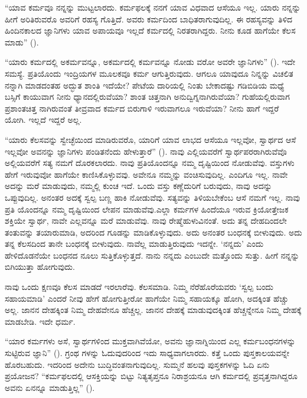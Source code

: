“ಯಾವ ಕರ್ಮವೂ ನನ್ನನ್ನು ಮುಟ್ಟಲಾರದು. ಕರ್ಮಫಲಕ್ಕೆ ನನಗೆ ಯಾವ ವಿಧವಾದ ಆಸೆಯೂ ಇಲ್ಲ. ಯಾರು ನನ್ನನ್ನು ಹೀಗೆ ಅರಿತಿರುವರೊ ಅವರಿಗೆ ರಹಸ್ಯ ಗೊತ್ತಿದೆ. ಅವರು ಕರ್ಮದಿಂದ ಬಾಧಿತರಾಗುವುದಿಲ್ಲ. ಈ ರಹಸ್ಯವನ್ನು ತಿಳಿದ ಹಿಂದಿನಕಾಲದ ಜ್ಞಾನಿಗಳು ಯಾವ ಅಪಾಯವೂ ಇಲ್ಲದೆ ಕರ್ಮದಲ್ಲಿ ನಿರತರಾಗಿದ್ದರು. ನೀನು ಕೂಡ ಹಾಗೆಯೇ ಕೆಲಸ ಮಾಡು” ().

“ಯಾರು ಕರ್ಮದಲ್ಲಿ ಅಕರ್ಮವನ್ನೂ, ಅಕರ್ಮದಲ್ಲಿ ಕರ್ಮವನ್ನೂ ನೋಡು ವರೋ ಅವರೇ ಜ್ಞಾನಿಗಳು” (). ಇದೇ ಸಮಸ್ಯೆ. ಪ್ರತಿಯೊಂದು ಇಂದ್ರಿಯಗಳ ಮೂಲಕವೂ ಕರ್ಮ ಆಗುತ್ತಿರುವುದು. ಆಗಲೂ ಯಾವುದೂ ನಿನ್ನನ್ನು ವಿಚಲಿತ ನನ್ನಾಗಿ ಮಾಡದಂತಹ ಅದ್ಭುತ ಶಾಂತಿ ಇದೆಯೇ? ಪೇಟೆಯ ದಾರಿಯಲ್ಲಿ ನಿಂತು ಬೇಕಾದಷ್ಟು ಗಡಿಬಿಡಿಯ ಮಧ್ಯೆ ಬಸ್ಸಿಗೆ ಕಾಯುವಾಗ ನೀನು ಧ್ಯಾನದಲ್ಲಿರುವೆಯಾ? ಶಾಂತ ಚಿತ್ತನಾಗಿ ಅನುದ್ವಿಗ್ನನಾಗಿರುವೆಯಾ? ಗುಹೆಯಲ್ಲಿರುವಾಗ ಪ್ರಶಾಂತಚಿತ್ತ ನಾಗಿರುವಂತೆ ತೀವ್ರವಾದ ಕರ್ಮದ ಬಿರುಗಾಳಿ ಇರುವಾಗಲೂ ಇರುವೆಯಾ? ನೀನು ಹಾಗೆ ಇದ್ದರೆ ಯೋಗಿ. ಇಲ್ಲದೆ ಇದ್ದರೆ ಅಲ್ಲ.

“ಯಾರು ಕೆಲಸವನ್ನು ಸ್ವೇಚ್ಛೆಯಿಂದ ಮಾಡಿರುವರೊ, ಯಾರಿಗೆ ಯಾವ ಲಾಭದ ಆಸೆಯೂ ಇಲ್ಲವೋ, ಸ್ವಾರ್ಥದ ಆಸೆ ಇಲ್ಲವೋ ಅವನನ್ನು ಜ್ಞಾನಿಗಳು ಪಂಡಿತನೆಂದು ಹೇಳುತ್ತಾರೆ” (). ನಾವು ಎಲ್ಲಿಯವರೆಗೆ ಸ್ವಾರ್ಥಪರರಾಗಿರುವೆವೊ ಅಲ್ಲಿಯವರೆಗೆ ಸತ್ಯ ನಮಗೆ ದೊರಕಲಾರದು. ನಾವು ಪ್ರತಿಯೊಂದನ್ನೂ ನಮ್ಮ ದೃಷ್ಟಿಯಿಂದ ನೋಡುವೆವು. ವಸ್ತುಗಳು ಹೇಗೆ ಇರುವುವೋ ಹಾಗೆಯೇ ಕಾಣಿಸಿಕೊಳ್ಳುವವು. ಅವೇನೂ ನಮ್ಮನ್ನು ವಂಚಿಸುವುದಿಲ್ಲ. ಎಂದಿಗೂ ಇಲ್ಲ. ನಾವೇ ಅದನ್ನು ಮರೆ ಮಾಡುವುದು, ನಮ್ಮಲ್ಲಿ ಕುಂಚ ಇದೆ. ಒಂದು ವಸ್ತು ಕಣ್ಣೆದುರಿಗೆ ಬರುವುದು, ನಾವು ಅದನ್ನು ಒಪ್ಪುವುದಿಲ್ಲ. ಅನಂತರ ಅದಕ್ಕೆ ಸ್ವಲ್ಪ ಬಣ್ಣ ಹಾಕಿ ನೋಡುವೆವು. ಸತ್ಯವನ್ನು ತಿಳಿಯಬೇಕೆಂಬ ಆಸೆ ನಮಗೆ ಇಲ್ಲ. ನಾವು ಪ್ರತಿ ಯೊಂದನ್ನೂ ನಮ್ಮ ದೃಷ್ಟಿಯಿಂದ ಲೇಪನ ಮಾಡುವೆವು.ಎಲ್ಲಾ ಕರ್ಮಗಳ ಹಿಂದೆಯೂ ಇರುವ ಕ್ರಿಯೋತ್ತೇಜಕ ಶಕ್ತಿಯೇ ಸ್ವಾರ್ಥ, ನಾವೇ ಎಲ್ಲವನ್ನೂ ಮರೆ ಮಾಡುವೆವು. ನಾವು ರೇಷ್ಮೆಹುಳುವಿನಂತೆ. ಅದು ತನ್ನ ದೇಹದಿಂದಲೇ ತಂತುವನ್ನು ತಯಾರುಮಾಡಿ, ಅದರಿಂದ ಗೂಡನ್ನು ಮಾಡಿಕೊಳ್ಳುವುದು. ಅದು ಅನಂತರ ಬಂಧನಕ್ಕೆ ಬೀಳುವುದು. ಅದು ತನ್ನ ಕೆಲಸದಿಂದ ತಾನೇ ಬಂಧನಕ್ಕೆ ಬೀಳುವುದು. ನಾವೆಲ್ಲ ಮಾಡುತ್ತಿರುವುದು ಇದನ್ನೇ. ‘ನನ್ನದು’ ಎಂದು ಹೇಳಿದೊಡನೆಯೇ ಬಂಧನದ ನೂಲು ಸುತ್ತಿಕೊಳ್ಳುತ್ತದೆ. ನಾನು ನನ್ನದು ಎಂಬುದೇ ಮತ್ತೊಂದು ಸುತ್ತು. ಹೀಗೆ ನನ್ನನ್ನು ಬಿಗಿಯುತ್ತಾ ಹೋಗುವುದು.

ನಾವು ಒಂದು ಕ್ಷಣವೂ ಕೆಲಸ ಮಾಡದೆ ಇರಲಾರೆವು. ಕೆಲಸಮಾಡಿ. ನಿಮ್ಮ ನೆರೆಹೊರೆಯವರು ‘ಸ್ವಲ್ಪ ಬಂದು ಸಹಾಯಮಾಡಿ’ ಎಂದರೆ ನೀವು ಹೇಗೆ ಹೋಗುತ್ತೀರೋ ಹಾಗೆಯೇ ನಿಮ್ಮ ಸಹಾಯಕ್ಕೂ ಹೋಗಿ, ಅದಕ್ಕಿಂತ ಹೆಚ್ಚು ಅಲ್ಲ. ಜಾನನ ದೇಹಕ್ಕಿಂತ ನಿಮ್ಮ ದೇಹವೇನೂ ಹೆಚ್ಚಲ್ಲ. ಜಾನನ ದೇಹಕ್ಕೆ ಮಾಡುವುದಕ್ಕಿಂತ ಹೆಚ್ಚನ್ನೇನೂ ನಿಮ್ಮ ದೇಹಕ್ಕೆ ಮಾಡಬೇಡಿ. ಇದೇ ಧರ್ಮ.

“ಯಾರ ಕರ್ಮಗಳು ಅಸೆ, ಸ್ವಾರ್ಥಗಳಿಂದ ಮುಕ್ತವಾಗಿವೆಯೋ, ಅವನು ಜ್ಞಾನಾಗ್ನಿಯಿಂದ ಎಲ್ಲ ಕರ್ಮಬಂಧನಗಳನ್ನು ಸುಟ್ಟಿರುವ ಜ್ಞಾನಿ” (). ಗ್ರಂಥ ಗಳನ್ನು ಓದುವುದರಿಂದ ಇದು ಸಾಧ್ಯವಾಗಲಾರದು. ಕತ್ತೆ ಒಂದು ಪುಸ್ತಕಾಲಯವನ್ನೇ ಹೊರಬಹುದು. ಇದರಿಂದ ಅದೇನು ಬುದ್ಧಿವಂತನಾಗುವುದಿಲ್ಲ. ಸುಮ್ಮನೆ ಹಲವು ಪುಸ್ತಕಗಳನ್ನು ಓದಿ ಏನು ಪ್ರಯೋಜನ? “ಕರ್ಮಫಲದಲ್ಲಿ ಆಸಕ್ತಿಯನ್ನು ಬಿಟ್ಟು ನಿತ್ಯತೃಪ್ತನೂ ನಿರಾಶ್ರಯನೂ ಆಗಿ ಕರ್ಮದಲ್ಲಿ ಪ್ರವೃತ್ತನಾಗಿದ್ದರೂ ಅವನು ಏನನ್ನೂ ಮಾಡುತ್ತಿಲ್ಲ” ().

